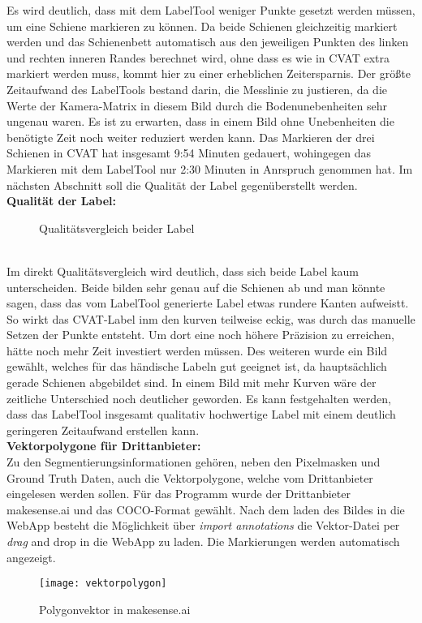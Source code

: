 \noindent
Es wird deutlich, dass mit dem LabelTool weniger Punkte gesetzt werden müssen, um eine Schiene markieren zu können. Da beide Schienen gleichzeitig markiert werden und das Schienenbett automatisch aus den jeweiligen Punkten des linken und rechten inneren Randes berechnet wird, ohne dass es wie in CVAT extra markiert werden muss, kommt hier zu einer erheblichen Zeitersparnis. Der größte Zeitaufwand des LabelTools bestand darin, die Messlinie zu justieren, da die Werte der Kamera-Matrix in diesem Bild durch die Bodenunebenheiten sehr ungenau waren. Es ist zu erwarten, dass in einem Bild ohne Unebenheiten die benötigte Zeit noch weiter reduziert werden kann. Das Markieren der drei Schienen in CVAT hat insgesamt 9:54 Minuten gedauert, wohingegen das Markieren mit dem LabelTool nur 2:30 Minuten in Anrspruch genommen hat. Im nächsten Abschnitt soll die Qualität der Label gegenüberstellt werden.
\\

\noindent
\textbf{Qualität der Label:}
\\

\noindent
\begin{figure}[h]
\caption{Qualitätsvergleich beider Label}
\end{figure}
\\

\noindent
Im direkt Qualitätsvergleich wird deutlich, dass sich beide Label kaum unterscheiden. Beide bilden sehr genau auf die Schienen ab und man könnte sagen, dass das vom LabelTool generierte Label etwas rundere Kanten aufweistt. So wirkt das CVAT-Label inm den kurven teilweise eckig, was durch das manuelle Setzen der Punkte entsteht. Um dort eine noch höhere Präzision zu erreichen, hätte noch mehr Zeit investiert werden müssen. Des weiteren wurde ein Bild gewählt, welches für das händische Labeln gut geeignet ist, da hauptsächlich gerade Schienen abgebildet sind. In einem Bild mit mehr Kurven wäre der zeitliche Unterschied noch deutlicher geworden. Es kann festgehalten werden, dass das LabelTool insgesamt qualitativ hochwertige Label mit einem deutlich geringeren Zeitaufwand erstellen kann.
\\

\noindent
\textbf{Vektorpolygone für Drittanbieter:}
\\

\noindent
Zu den Segmentierungsinformationen gehören, neben den Pixelmasken und Ground Truth Daten, auch die Vektorpolygone, welche vom Drittanbieter eingelesen werden sollen. Für das Programm wurde der Drittanbieter makesense.ai und das COCO-Format gewählt. Nach dem laden des Bildes in die WebApp besteht die Möglichkeit über \textit{import annotations} die Vektor-Datei per \textit{drag} and drop in die WebApp zu laden. Die Markierungen werden automatisch angezeigt.
\begin{figure}[H]
  \texttt{[image: vektorpolygon]}
  \caption{Polygonvektor in makesense.ai}
\end{figure}

